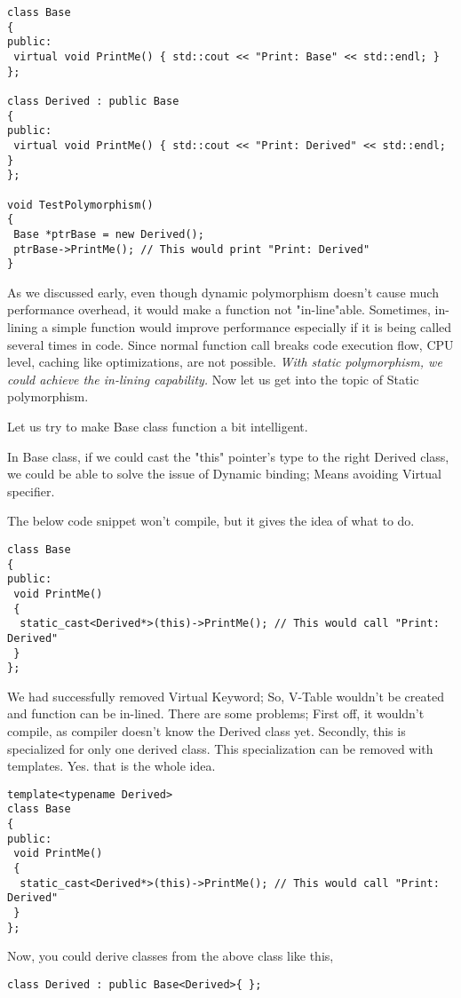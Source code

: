 \documentclass{book}
\begin{document}
\begin{lstlisting}
class Base
{
public:
 virtual void PrintMe() { std::cout << "Print: Base" << std::endl; }
};

class Derived : public Base
{
public:
 virtual void PrintMe() { std::cout << "Print: Derived" << std::endl; }
};

void TestPolymorphism()
{
 Base *ptrBase = new Derived();
 ptrBase->PrintMe(); // This would print "Print: Derived"
}
\end{lstlisting}

As we discussed early, even though dynamic polymorphism doesn't cause much performance overhead, it would make a function not "in-line"able.
Sometimes, in-lining a simple function would improve performance especially if it is being called several times in code.
Since normal function call breaks code execution flow, CPU level, caching like optimizations, are not possible.
\textit{With static polymorphism, we could achieve the in-lining capability.} Now let us get into the topic of Static polymorphism.

Let us try to make Base class function a bit intelligent.

In Base class, if we could cast the "this" pointer's type to the right Derived class, we could be able to solve the issue of Dynamic binding; Means avoiding Virtual specifier.

The below code snippet won't compile, but it gives the idea of what to do.
\begin{verbatim}
class Base
{
public:
 void PrintMe()
 {
  static_cast<Derived*>(this)->PrintMe(); // This would call "Print: Derived"
 }
};
\end{verbatim}

We had successfully removed Virtual Keyword; So, V-Table wouldn't be created and function can be in-lined.
There are some problems; First off, it wouldn't compile, as compiler doesn't know the Derived class yet.
Secondly, this is specialized for only one derived class. This specialization can be removed with templates. Yes. that is the whole idea.

\begin{verbatim}
template<typename Derived>
class Base
{
public:
 void PrintMe()
 {
  static_cast<Derived*>(this)->PrintMe(); // This would call "Print: Derived"
 }
};
\end{verbatim}

Now, you could derive classes from the above class like this,

\begin{verbatim}
class Derived : public Base<Derived>{ };
\end{verbatim}
\end{document}
